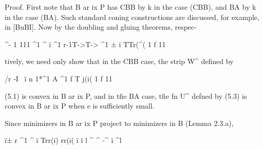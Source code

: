 Proof. First note that B ar ix P has CBB by k in the case (CBB), and BA
by k in the case (BA). Such standard coning constructions are discussed,
for example, in [BuBI]. Now by the doubling and gluing theorems, respec-

^-       1                                                                                                                                                                                  111                                                                              ^1      ^   ï       ^1                                                   r-1T->T->                                                                                                                    ^1                                                                ±    ï       TTr(^(     1   f                                                     11

tively, we need only show that in the CBB case, the strip W^   defined by

/r   -I \    ï                                                                                                                                                                                                                                 n                                                                                                                                                                                                                  1*^1                                                                                                                   A                                                                                                                             ^1        f       T j(i(     1   f                                                     11

(5.1) is convex in B ar ix P, and in tfie BA case, tfie fn U^ defned by
(5.3) is convex in B ar ix P when e is sufficiently small.

Since minimizers in B ar ix P project to minimizers in B (Lemma 2.3.a),

ï±        r ^1        ^  ï      Trr(i)                                                                                                                                                  rr(i(   ï                                                                                                       ï     l     ^   ^                                                                                                                                                                   -^      ï     ^l

